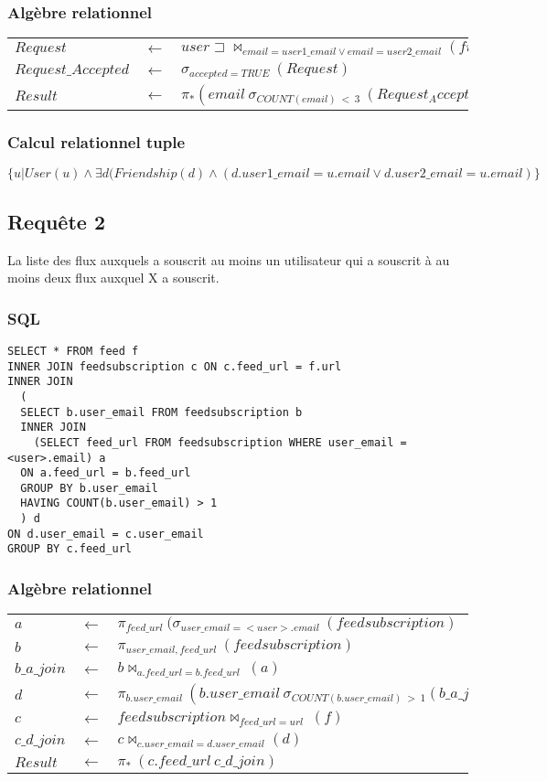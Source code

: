 \documentclass[a4paper,10pt]{article}
\begin{document}
\subsubsection{Algèbre relationnel}
\begin{center}
\begin{tabular}{lll}
$Request$		& $\leftarrow$ & $ user\sqsupset\Join_{email=user1\_email \vee email=user2\_email}( friendship)$\\
$Request\_Accepted$	& $\leftarrow$ & $ \sigma_{accepted=TRUE}\ (Request)$\\
$Result$		& $\leftarrow$ & $ \pi_* (email\ \sigma_{COUNT(email)\ <\ 3}\ (Request_Accepted) )$ 
\end{tabular}
\end{center}

\subsubsection{Calcul relationnel tuple}
$\{u|User(u) \wedge \exists d (Friendship(d) \wedge (d.user1\_email = u.email \vee d.user2\_email = u.email)\}$
\clearpage
\subsection{Requête 2}
La liste des flux auxquels a souscrit au moins un utilisateur qui a souscrit à au moins deux flux auxquel X
a souscrit.
\subsubsection{SQL}
\begin{lstlisting}
SELECT * FROM feed f
INNER JOIN feedsubscription c ON c.feed_url = f.url
INNER JOIN 
  (
  SELECT b.user_email FROM feedsubscription b 
  INNER JOIN 
    (SELECT feed_url FROM feedsubscription WHERE user_email = <user>.email) a
  ON a.feed_url = b.feed_url 
  GROUP BY b.user_email
  HAVING COUNT(b.user_email) > 1
  ) d
ON d.user_email = c.user_email
GROUP BY c.feed_url
\end{lstlisting}
\subsubsection{Algèbre relationnel}
\begin{center}
\begin{tabular}{lll}
$a$		& $\leftarrow$ & $ \pi_{feed\_url}\ (\sigma_{user\_email=<user>.email}\ (feedsubscription)$\\
$b$		& $\leftarrow$ & $ \pi_{user\_email, feed\_url}\ (feedsubscription)$\\
$b\_a\_join$	& $\leftarrow$ & $ b \Join_{a.feed\_url=b.feed\_url}\ (a)$\\
$d$		& $\leftarrow$ & $ \pi_{b.user\_email}\ (b.user\_email\ \sigma_{COUNT(b.user\_email)\ >\ 1} (b\_a\_join))$\\
$c$		& $\leftarrow$ & $ feedsubscription \Join_{feed\_url=url}\ (f)$\\
$c\_d\_join$	& $\leftarrow$ & $ c \Join_{c.user\_email=d.user\_email} (d)$\\
$Result$	& $\leftarrow$ & $ \pi_*\ (c.feed\_url\ c\_d\_join)$
\end{tabular}
\end{center}
\end{document}
